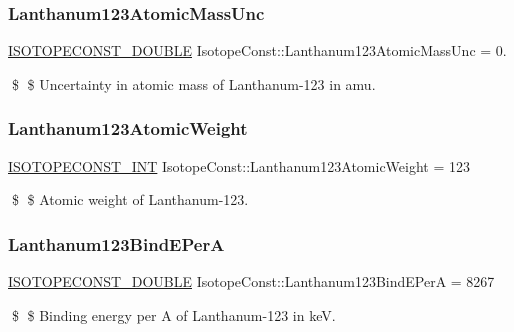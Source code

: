 \subsubsection{\texorpdfstring{Lanthanum123\+Atomic\+Mass\+Unc}{Lanthanum123AtomicMassUnc}}
{\footnotesize\ttfamily \mbox{\hyperlink{group___isotope_const-_macros_ga8f45a7272ce02c0b4c65c44636ed719a}{I\+S\+O\+T\+O\+P\+E\+C\+O\+N\+S\+T\+\_\+\+D\+O\+U\+B\+LE}} Isotope\+Const\+::\+Lanthanum123\+Atomic\+Mass\+Unc = 0.}

\$ \$ Uncertainty in atomic mass of Lanthanum-\/123 in amu. \mbox{\label{group___isotope_const-_lanthanum-_la123_ga912e6fc90d70a560f82418c638e8a8fa}} 
\subsubsection{\texorpdfstring{Lanthanum123\+Atomic\+Weight}{Lanthanum123AtomicWeight}}
{\footnotesize\ttfamily \mbox{\hyperlink{group___isotope_const-_macros_ga5f18360b3e99483a35c32d789e62621c}{I\+S\+O\+T\+O\+P\+E\+C\+O\+N\+S\+T\+\_\+\+I\+NT}} Isotope\+Const\+::\+Lanthanum123\+Atomic\+Weight = 123}

\$ \$ Atomic weight of Lanthanum-\/123. \mbox{\label{group___isotope_const-_lanthanum-_la123_ga9efcb63af27f145990ab32b3ca9a45c2}} 
\subsubsection{\texorpdfstring{Lanthanum123\+Bind\+E\+PerA}{Lanthanum123BindEPerA}}
{\footnotesize\ttfamily \mbox{\hyperlink{group___isotope_const-_macros_ga8f45a7272ce02c0b4c65c44636ed719a}{I\+S\+O\+T\+O\+P\+E\+C\+O\+N\+S\+T\+\_\+\+D\+O\+U\+B\+LE}} Isotope\+Const\+::\+Lanthanum123\+Bind\+E\+PerA = 8267}

\$ \$ Binding energy per A of Lanthanum-\/123 in keV. \mbox{\label{group___isotope_const-_lanthanum-_la123_ga6f1ca393a390d6d6db7901b2883a7c80}} 
